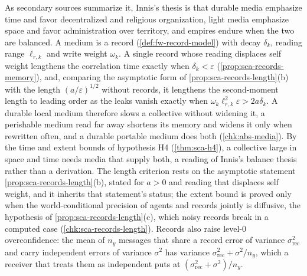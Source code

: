 \begin{remark}\label{rem:abs-innis}
As secondary sources summarize it, Innis's thesis \citep{innis1950empire} is that durable media emphasize time and favor decentralized and religious organization, light media emphasize space and favor administration over territory, and empires endure when the two are balanced. A medium is a record (\cref{def:fw-record-model}) with decay $\delta_k$, reading range $\ell_{r,k}$ and write weight $\omega_k$. A single record whose reading displaces self weight lengthens the correlation time exactly when $\delta_k<\varepsilon$ (\cref{prop:sca-records-memory}), and, comparing the asymptotic form of \cref{prop:sca-records-length}(b) with the length $(a/\varepsilon)^{1/2}$ without records, it lengthens the second-moment length to leading order as the leaks vanish exactly when $\omega_k\ell_{r,k}^2\varepsilon>2a\delta_k$. A durable local medium therefore slows a collective without widening it, a perishable medium read far away shortens its memory and widens it only when rewritten often, and a durable portable medium does both (\cref{chk:abs-media}). By the time and extent bounds of hypothesis H4 (\cref{thm:sca-h4}), a collective large in space and time needs media that supply both, a reading of Innis's balance thesis rather than a derivation. The length criterion rests on the asymptotic statement \cref{prop:sca-records-length}(b), stated for $a>0$ and reading that displaces self weight, and it inherits that statement's status; the extent bound is proved only when the world-conditional precision of agents and records jointly is diffusive, the hypothesis of \cref{prop:sca-records-length}(c), which noisy records break in a computed case (\cref{chk:sca-records-length}). Records also raise level-0 overconfidence: the mean of $n_y$ messages that share a record error of variance $\sigma^2_{\mathrm{rec}}$ and carry independent errors of variance $\sigma^2$ has variance $\sigma^2_{\mathrm{rec}}+\sigma^2/n_y$, which a receiver that treats them as independent puts at $(\sigma^2_{\mathrm{rec}}+\sigma^2)/n_y$.
\end{remark}

